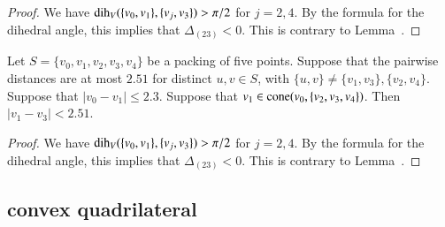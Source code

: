 \begin{tarskidata}
\begin{tarski}
\begin{proof}
We have $\operatorname{dih}_V(\{v_0,v_1\},\{v_j,v_3\})>\pi/2$ for $j=2,4$.
  By the formula for the dihedral angle, this
implies that $\Delta_{(23)}<0$.  This is contrary to Lemma~.
\end{proof}
\end{tarski}







\begin{tarski}

\begin{lemma}
Let $S=\{v_0,v_1,v_2,v_3,v_4\}$ be a packing of
five points.  Suppose that the pairwise
distances are at most $2.51$ for distinct $u,v\in S$, with
$\{u,v\}\ne \{v_1,v_3\}, \{v_2,v_4\}$.  Suppose that $|v_0-v_1|\le 2.3$.
Suppose that $v_1\in{\operatorname{cone}}(v_0,\{v_2,v_3,v_4\})$.
Then $|v_1-v_3|< 2.51$.  
\end{lemma}

\begin{proof}
We have $\operatorname{dih}_V(\{v_0,v_1\},\{v_j,v_3\})>\pi/2$ for $j=2,4$.
  By the formula for the dihedral angle, this
implies that $\Delta_{(23)}<0$.  This is contrary to Lemma~.
\end{proof}
\end{tarski}









\begin{tarski}
\subsection{convex quadrilateral}


\end{tarski}
\end{tarskidata}
